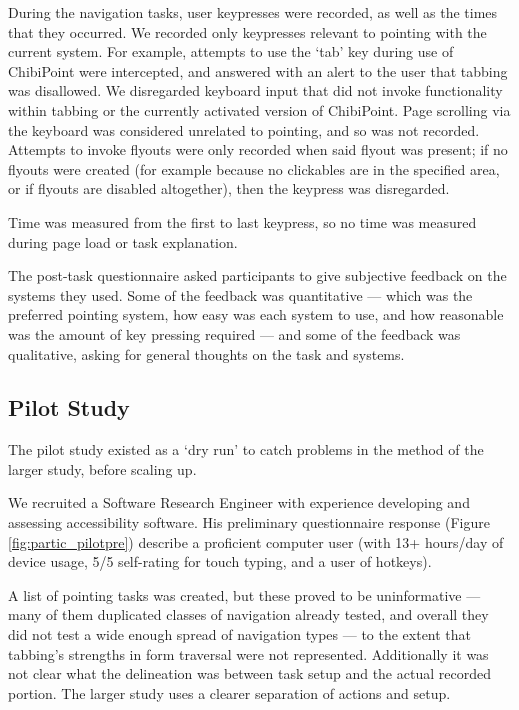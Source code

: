 \documentclass[a4paper, 12pt]{report}
\begin{document}
During the navigation tasks, user keypresses were recorded, as well as the times that they occurred. We recorded only keypresses relevant to pointing with the current system. For example, attempts to use the `tab' key during use of ChibiPoint were intercepted, and answered with an alert to the user that tabbing was disallowed. We disregarded keyboard input that did not invoke functionality within tabbing or the currently activated version of ChibiPoint. Page scrolling via the keyboard was considered unrelated to pointing, and so was not recorded. Attempts to invoke flyouts were only recorded when said flyout was present; if no flyouts were created (for example because no clickables are in the specified area, or if flyouts are disabled altogether), then the keypress was disregarded.

Time was measured from the first to last keypress, so no time was measured during page load or task explanation.

The post-task questionnaire asked participants to give subjective feedback on the systems they used. Some of the feedback was quantitative --- which was the preferred pointing system, how easy was each system to use, and how reasonable was the amount of key pressing required --- and some of the feedback was qualitative, asking for general thoughts on the task and systems.

\subsection{Pilot Study}
The pilot study existed as a `dry run' to catch problems in the method of the larger study, before scaling up.

We recruited a Software Research Engineer with experience developing and assessing accessibility software. His preliminary questionnaire response (Figure \ref{fig:partic_pilotpre}) describe a proficient computer user (with 13+ hours/day of device usage, 5/5 self-rating for touch typing, and a user of hotkeys).

A list of pointing tasks was created, but these proved to be uninformative --- many of them duplicated classes of navigation already tested, and overall they did not test a wide enough spread of navigation types --- to the extent that tabbing's strengths in form traversal were not represented. Additionally it was not clear what the delineation was between task setup and the actual recorded portion. The larger study uses a clearer separation of actions and setup.
\end{document}
